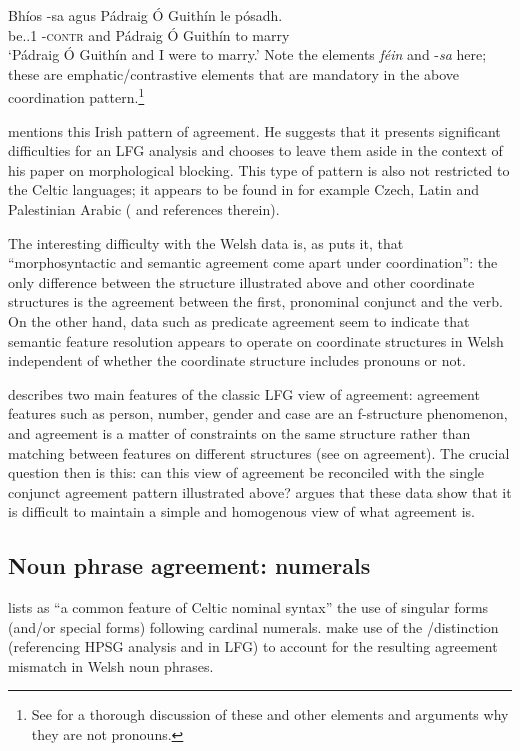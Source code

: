 \documentclass[output=paper,colorlinks,citecolor=brown]{langscibook}
\begin{document}
\ex
\gll Bhíos  -sa  agus Pádraig \'O Guithín le p\'osadh.\\
{be.\PST.1\SG} -\textsc{contr} and Pádraig \'O Guithín to marry\\
\glt`Pádraig \'O Guithín and I were to marry.'
\z\z
Note the elements \emph{f\'ein} and -\emph{sa} here; these are emphatic/contrastive elements that are mandatory in the above coordination pattern.\footnote{See \citealt[493--496]{McCloskeyHale1984} for a thorough discussion of these and other elements and arguments why they are not pronouns.}

\citet[522--523]{Andrews90} mentions this Irish pattern of agreement. He suggests that it presents significant difficulties for an LFG analysis and chooses to leave them aside in the context of his paper on morphological blocking. This type of pattern is also not restricted to the Celtic languages; it appears to be found in for example Czech, Latin and Palestinian Arabic (\citealt[4]{Sadler1999} and references therein).

The interesting difficulty with the Welsh data is, as \citet[15]{Sadler1999} puts it, that ``morphosyntactic and semantic agreement come apart under coordination'': the only difference between the structure illustrated above and other coordinate structures is the agreement between the first, pronominal conjunct and the verb. On the other hand, data such as predicate agreement seem to indicate that semantic feature resolution appears to operate on coordinate structures in Welsh independent of whether the coordinate structure includes pronouns or not.

\citet{Sadler1999} describes two main features of the classic LFG view of agreement: agreement features such as person, number, gender and case are an f-structure phenomenon, and agreement is a matter of constraints on the same structure rather than matching between features on different structures (see  on agreement). The crucial question then is this: can this view of agreement be reconciled with the single conjunct agreement pattern illustrated above? \citet{Sadler1999} argues that these data show that it is difficult to maintain a simple and homogenous view of what agreement is.

\subsection{Noun phrase agreement: numerals}
\label{sec:Celtic:4.3}

\citet[21]{Fife2002} lists as ``a common feature of Celtic nominal syntax'' the use of singular forms (and/or special forms) following cardinal numerals. \citet{MittSadl05} make use of the \NINDEX/\CONCORD distinction (referencing  HPSG analysis and \citet{kingdalrymple04} in LFG) to account for the resulting agreement mismatch in Welsh noun phrases.
\end{document}
